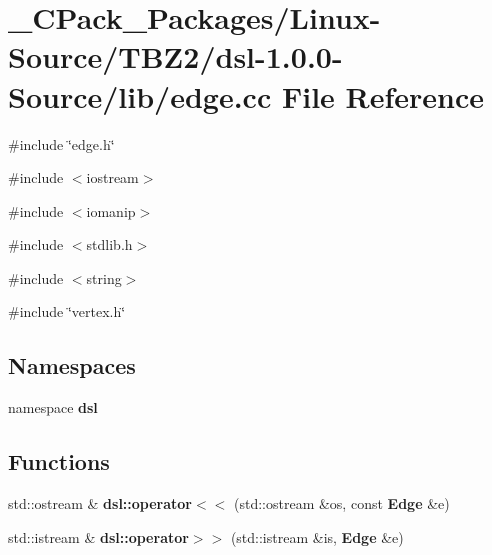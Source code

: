 \section{\_\-CPack\_\-Packages/Linux-\/Source/TBZ2/dsl-\/1.0.0-\/Source/lib/edge.cc File Reference}
\label{__CPack__Packages_2Linux-Source_2TBZ2_2dsl-1_80_80-Source_2lib_2edge_8cc}
{\ttfamily \#include \char`\"{}edge.h\char`\"{}}\par
{\ttfamily \#include $<$iostream$>$}\par
{\ttfamily \#include $<$iomanip$>$}\par
{\ttfamily \#include $<$stdlib.h$>$}\par
{\ttfamily \#include $<$string$>$}\par
{\ttfamily \#include \char`\"{}vertex.h\char`\"{}}\par
\subsection*{Namespaces}
\begin{DoxyCompactItemize}
\item 
namespace {\bf dsl}
\end{DoxyCompactItemize}
\subsection*{Functions}
\begin{DoxyCompactItemize}
\item 
std::ostream \& {\bf dsl::operator$<$$<$} (std::ostream \&os, const {\bf Edge} \&e)
\item 
std::istream \& {\bf dsl::operator$>$$>$} (std::istream \&is, {\bf Edge} \&e)
\end{DoxyCompactItemize}
